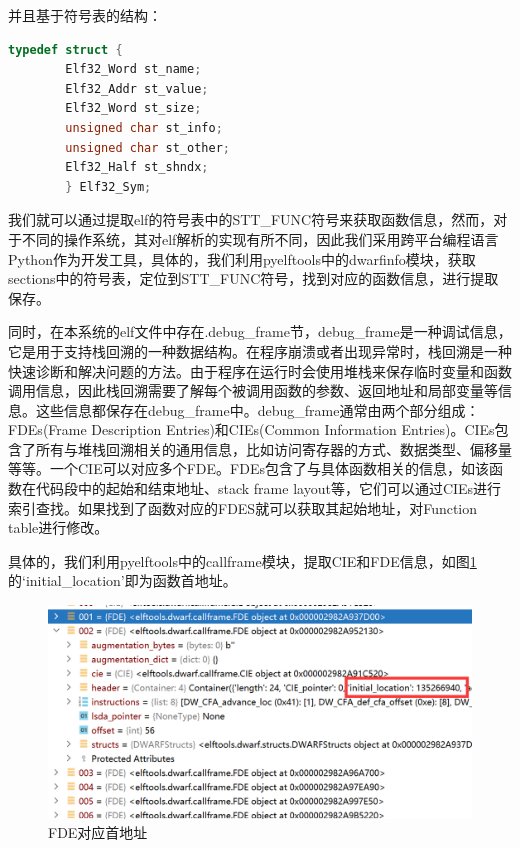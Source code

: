 \documentclass[UTF8,12pt,a4paper]{ctexart}
\numberwithin{figure}{section}
\begin{document}
\par 并且基于符号表的结构：
\begin{lstlisting}[language=C]
    typedef struct { 
        Elf32_Word st_name; 
        Elf32_Addr st_value; 
        Elf32_Word st_size; 
        unsigned char st_info; 
        unsigned char st_other; 
        Elf32_Half st_shndx; 
        } Elf32_Sym;
\end{lstlisting}
\par 我们就可以通过提取elf的符号表中的STT\_FUNC符号来获取函数信息，然而，对于不同的操作系统，其对elf解析的实现有所不同，因此我们采用跨平台编程语言Python作为开发工具，具体的，我们利用pyelftools中的dwarfinfo模块，获取sections中的符号表，定位到STT\_FUNC符号，找到对应的函数信息，进行提取保存。
\par 同时，在本系统的elf文件中存在.debug\_frame节，debug\_frame是一种调试信息，它是用于支持栈回溯的一种数据结构。在程序崩溃或者出现异常时，栈回溯是一种快速诊断和解决问题的方法。由于程序在运行时会使用堆栈来保存临时变量和函数调用信息，因此栈回溯需要了解每个被调用函数的参数、返回地址和局部变量等信息。这些信息都保存在debug\_frame中。debug\_frame通常由两个部分组成：FDEs(Frame Description Entries)和CIEs(Common Information Entries)。CIEs包含了所有与堆栈回溯相关的通用信息，比如访问寄存器的方式、数据类型、偏移量等等。一个CIE可以对应多个FDE。FDEs包含了与具体函数相关的信息，如该函数在代码段中的起始和结束地址、stack frame layout等，它们可以通过CIEs进行索引查找。如果找到了函数对应的FDES就可以获取其起始地址，对Function table进行修改。
\par 具体的，我们利用pyelftools中的callframe模块，提取CIE和FDE信息，如图\ref{id}的‘initial\_location’即为函数首地址。
\begin{figure}
    \centering
    \includegraphics[scale=0.3]{graph/A.png}
    \caption{FDE对应首地址}
    \label{id}
\end{figure}
\end{document}
